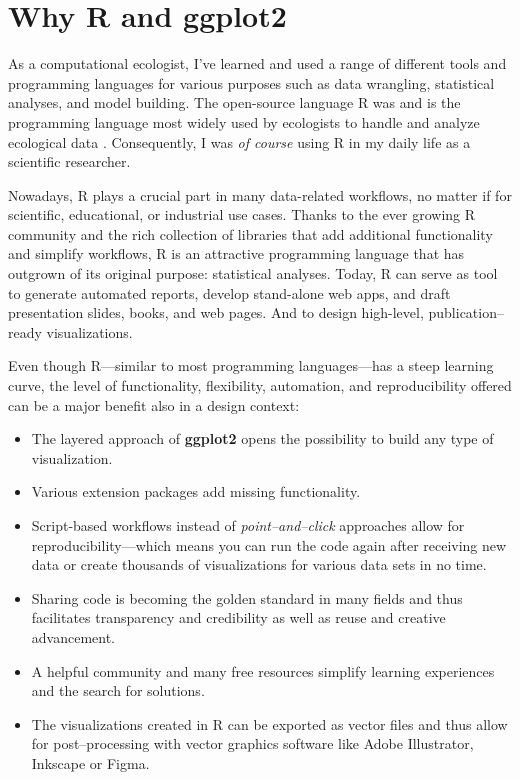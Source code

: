 \documentclass[
]{krantz}
\providecommand{\tightlist}{%
  \setlength{\itemsep}{0pt}\setlength{\parskip}{0pt}}
\begin{document}
\hypertarget{why}{%
\section{\texorpdfstring{Why R and \textbf{ggplot2}}{Why R and ggplot2}}\label{why}}

As a computational ecologist, I've learned and used a range of different tools and programming languages for various purposes such as data wrangling, statistical analyses, and model building. The open-source language R was and is the programming language most widely used by ecologists to handle and analyze ecological data \citep{sciaini2018}. Consequently, I was \emph{of course} using R in my daily life as a scientific researcher.

Nowadays, R plays a crucial part in many data-related workflows, no matter if for scientific, educational, or industrial use cases. Thanks to the ever growing R community and the rich collection of libraries that add additional functionality and simplify workflows, R is an attractive programming language that has outgrown of its original purpose: statistical analyses. Today, R can serve as tool to generate automated reports, develop stand-alone web apps, and draft presentation slides, books, and web pages. And to design high-level, publication--ready visualizations.

Even though R---similar to most programming languages---has a steep learning curve, the level of functionality, flexibility, automation, and reproducibility offered can be a major benefit also in a design context:

\begin{itemize}
\tightlist
\item
  The layered approach of \textbf{ggplot2} opens the possibility to build any type of visualization.
\item
  Various extension packages add missing functionality.
\item
  Script-based workflows instead of \emph{point--and--click} approaches allow for reproducibility---which means you can run the code again after receiving new data or create thousands of visualizations for various data sets in no time.
\item
  Sharing code is becoming the golden standard in many fields and thus facilitates transparency and credibility as well as reuse and creative advancement.
\item
  A helpful community and many free resources simplify learning experiences and the search for solutions.
\item
  The visualizations created in R can be exported as vector files and thus allow for post--processing with vector graphics software like Adobe Illustrator, Inkscape or Figma.
\end{itemize}
\end{document}

